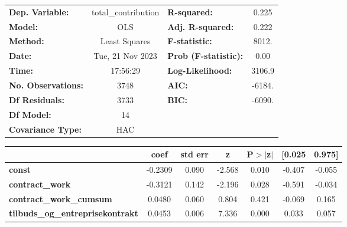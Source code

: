 \begin{center}
\begin{tabular}{lclc}
\toprule
\textbf{Dep. Variable:}                     & total\_contribution & \textbf{  R-squared:         } &     0.225   \\
\textbf{Model:}                             &         OLS         & \textbf{  Adj. R-squared:    } &     0.222   \\
\textbf{Method:}                            &    Least Squares    & \textbf{  F-statistic:       } &     8012.   \\
\textbf{Date:}                              &   Tue, 21 Nov 2023  & \textbf{  Prob (F-statistic):} &     0.00    \\
\textbf{Time:}                              &       17:56:29      & \textbf{  Log-Likelihood:    } &    3106.9   \\
\textbf{No. Observations:}                  &          3748       & \textbf{  AIC:               } &    -6184.   \\
\textbf{Df Residuals:}                      &          3733       & \textbf{  BIC:               } &    -6090.   \\
\textbf{Df Model:}                          &            14       & \textbf{                     } &             \\
\textbf{Covariance Type:}                   &         HAC         & \textbf{                     } &             \\
\bottomrule
\end{tabular}
\begin{tabular}{lcccccc}
                                            & \textbf{coef} & \textbf{std err} & \textbf{z} & \textbf{P$> |$z$|$} & \textbf{[0.025} & \textbf{0.975]}  \\
\midrule
\textbf{const}                              &      -0.2309  &        0.090     &    -2.568  &         0.010        &       -0.407    &       -0.055     \\
\textbf{contract\_work}                     &      -0.3121  &        0.142     &    -2.196  &         0.028        &       -0.591    &       -0.034     \\
\textbf{contract\_work\_cumsum}             &       0.0480  &        0.060     &     0.804  &         0.421        &       -0.069    &        0.165     \\
\textbf{tilbuds\_og\_entreprisekontrakt}    &       0.0453  &        0.006     &     7.336  &         0.000        &        0.033    &        0.057     \\

\end{tabular}
\end{center}
